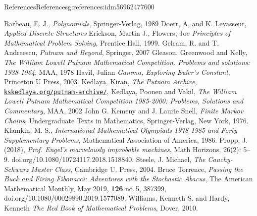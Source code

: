 \documentclass[twoside,10pt,]{book}
\numberwithin{equation}{section}
\begin{document}
\begin{references-chapter-numberless}{References}{}{References}{}{}{g:references:idm56962477600}
\begin{referencelist}
\hypertarget{x:biblio:biblio-barbeau-1989}{}Barbeau, E. J., \textit{Polynomials}, Springer-Verlag, 1989
\hypertarget{x:biblio:biblio-doerr-2019}{}Doerr, A, and K. Levasseur, \textit{Applied Discrete Structures}
\hypertarget{x:biblio:biblio-allenby-1983}{}Erickson, Martin J., Flowers, Joe \textit{Principles of Mathematical Problem Solving}, Prentice Hall, 1999.
\hypertarget{x:biblio:biblio-titu-2007}{}Gelcam, R. and  T. Andreescu, \textit{Putnam and Beyond}, Springer, 2007
\hypertarget{x:biblio:biblio-putnam-1}{}Gleason, Greenwood and Kelly, \textit{The William Lowell Putnam Mathematical Competition. Problems and solutions: 1938-1964}, MAA, 1978
\hypertarget{x:biblio:biblio-havil-2003}{}Havil, Julian \textit{Gamma, Exploring Euler's Constant}, Princeton U Press, 2003.
\hypertarget{x:biblio:biblio-putnam-archive}{}Kedlaya, Kiran, \textit{The Putnam Archive}, \href{https://kskedlaya.org/putnam-archive/}{\nolinkurl{kskedlaya.org/putnam-archive/}},
\hypertarget{x:biblio:biblio-putnam-3}{}Kedlaya, Poonen and Vakil, \textit{The William Lowell Putnam Mathematical Competition 1985-2000: Problems, Solutions and Commentary}, MAA, 2002
\hypertarget{x:biblio:biblio-kemeny}{}John G. Kemeny and J. Laurie Snell, \textit{Finite Markov Chains}, Undergraduate Texts in Mathematics, Springer-Verlag, New York, 1976.
\hypertarget{x:biblio:biblio-klamkin-1986}{}Klamkin, M. S., \textit{International Mathematical Olympiads 1978-1985 and Forty Supplementary Problems}, Mathematical Association of America, 1986.
\hypertarget{x:biblio:biblio-propp}{}Propp, J. (2018), \textit{Prof.  Engel’s  marvelously  improbable  machines}, Math Horizons, 26(2):  5–9. doi.org\slash{}10.1080\slash{}10724117.2018.1518840.
\hypertarget{x:biblio:biblio-steele-2004}{}Steele, J. Michael, \textit{The Cauchy-Schwarz Master Class}, Cambridge U. Press, 2004.
\hypertarget{x:biblio:biblio-torrence}{}Bruce Torrence, \textit{Passing the Buck and Firing Fibonacci: Adventures with the Stochastic Abacus}, The American Mathematical Monthly, May 2019, \textbf{126} no.\@\,5, 387\textendash{}399, doi.org\slash{}10.1080\slash{}00029890.2019.1577089.
\hypertarget{x:biblio:biblio-williams-2010}{}Williams, Kenneth S. and  Hardy, Kenneth \textit{The Red Book of Mathematical Problems}, Dover, 2010.
\end{referencelist}
\end{references-chapter-numberless}
\end{document}
